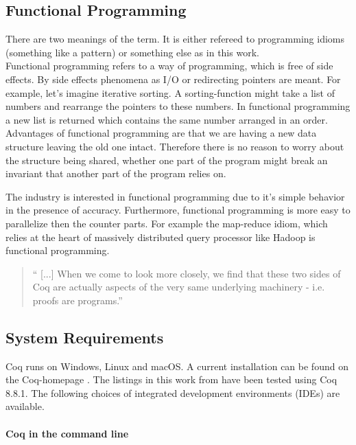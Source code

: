 \subsection{Functional Programming}

There are two meanings of the term. 
It is either refereed to programming idioms (something like a pattern) or something else as in this work.\\

Functional programming refers to a way of programming, which is free of side effects.
By side effects phenomena as I/O or redirecting pointers are meant. 
For example, let's imagine iterative sorting. 
A sorting-function might take a list of numbers and rearrange the pointers to these numbers.
In functional programming a new list is returned which contains the same number arranged in an order.\\ 
Advantages of functional programming are that we are having a new data structure leaving the old one intact. 
Therefore there is no reason to worry about the structure being shared, whether one part of the program might break an invariant that another part of the program relies on.\par
The industry is interested in functional programming due to it's simple behavior in the presence of accuracy.
Furthermore, functional programming is more easy to parallelize then the counter parts.
For example the map-reduce idiom, which relies at the heart of massively distributed query processor like \gls{Hadoop} is functional programming. 

\begin{quote}
`` [...] When we come to look more closely, we find that these two sides of Coq are actually aspects of the very same underlying machinery - i.e. proofs are programs.'' 
\end{quote}




\subsection{System Requirements}

Coq runs on Windows, Linux and macOS.
A current installation can be found on the Coq-homepage \cite{Coq}. 
The listings in this work from \cite{PACGGHSY} have been tested using Coq 8.8.1.
The following choices of integrated development environments (IDEs) are available. 


\paragraph{Coq in the command line}


